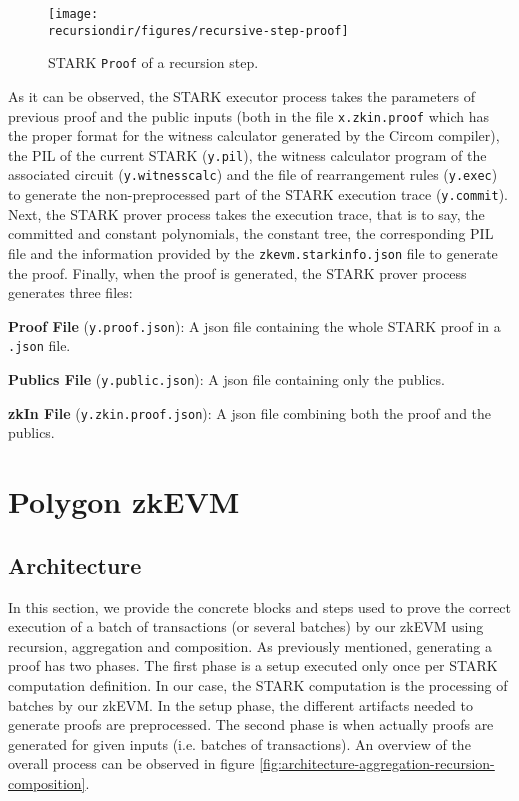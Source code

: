 \begin{figure}[H]
\centering
\texttt{[image: \\recursiondir/figures/recursive-step-proof]}
\caption{STARK \texttt{Proof} of a recursion step.}
\label{fig:recursion:step:proof}
\end{figure}

As it can be observed, the STARK executor process takes the parameters of previous proof and the public inputs (both in the file \texttt{x.zkin.proof} which
has the proper format for the witness calculator generated by the Circom compiler), the PIL of the current STARK (\texttt{y.pil}), the witness calculator program of the associated circuit (\texttt{y.witnesscalc}) and the file of rearrangement rules (\texttt{y.exec}) to generate the non-preprocessed part of the STARK execution trace (\texttt{y.commit}). 
Next, the STARK prover process takes the execution trace, that is to say, the committed and constant polynomials, the constant tree, the corresponding PIL file and the information provided by the \texttt{zkevm.starkinfo.json} file to generate the proof.
Finally, when the proof is generated, the STARK prover process generates three files:

\vspace{0.1cm}
\begin{compactitem}
\item \textbf{Proof File} (\texttt{y.proof.json}): A json file containing the whole STARK proof in a \texttt{.json} file. 

\item \textbf{Publics File} (\texttt{y.public.json}): A json file containing only the publics. 

\item \textbf{zkIn File} (\texttt{y.zkin.proof.json}): A json file combining both the proof and the publics. 
\end{compactitem}


\section{Polygon zkEVM \label{section:polygon:zkevm}}

\subsection{Architecture \label{subsec:zkEVM:architecture}}

In this section, we provide the concrete blocks and steps used to
prove the correct execution of a batch of transactions (or several batches)
by our zkEVM using recursion, aggregation and composition.
As previously mentioned, generating a proof has two phases. 
The first phase is a setup executed only once per STARK computation definition. 
In our case, the STARK computation is the processing of batches by our zkEVM.  
In the setup phase, the different artifacts needed to generate proofs are preprocessed.
The second phase is when actually proofs are generated for given inputs (i.e. batches of transactions).
An overview of the overall process can be observed in figure \ref{fig:architecture-aggregation-recursion-composition}.

